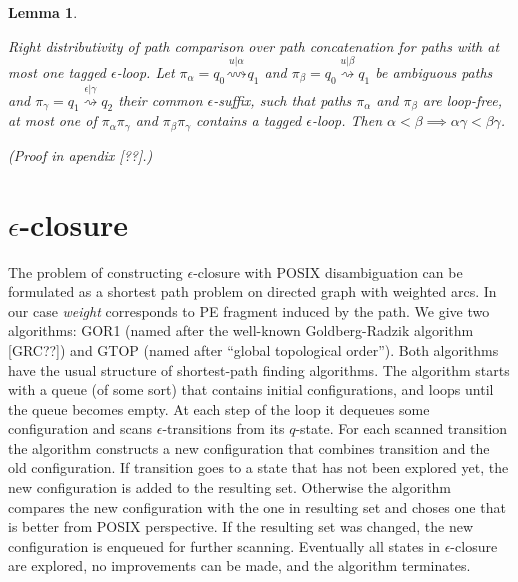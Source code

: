 \documentclass[AMA,STIX1COL]{WileyNJD-v2}
\newtheorem{XLem}{Lemma}
\begin{document}
\newcommand \lemmaclosurerightdist {
    \emph{Right distributivity of path comparison over path concatenation for paths with at most one tagged $\epsilon$-loop.}
    Let
    $\pi_\alpha = q_0 \overset {u | \alpha} {\rightsquigarrow} q_1$ and
    $\pi_\beta  = q_0 \overset {u | \beta}  {\rightsquigarrow} q_1$
    be ambiguous paths
    and $\pi_\gamma = q_1 \overset {\epsilon | \gamma} {\rightsquigarrow} q_2$
    their common $\epsilon$-suffix,
    such that paths $\pi_\alpha$ and $\pi_\beta$ are loop-free,
    at most one of $\pi_\alpha \pi_\gamma$ and $\pi_\beta \pi_\gamma$ contains a tagged $\epsilon$-loop.
    Then $\alpha < \beta \implies \alpha \gamma < \beta \gamma$.
}
\begin{XLem}\label{lemma_closure_rightdist}
\lemmaclosurerightdist
(Proof in apendix [??].)
\end{XLem}


\section{$\epsilon$-closure}\label{section_closure}

The problem of constructing $\epsilon$-closure with POSIX disambiguation
can be formulated as a shortest path problem on directed graph with weighted arcs.
In our case \emph{weight} corresponds to PE fragment induced by the path.
%
We give two algorithms: GOR1 (named after the well-known Goldberg-Radzik algorithm [GRC??])
and GTOP (named after ``global topological order'').
Both algorithms have the usual structure of shortest-path finding algorithms.
%
The algorithm starts with a queue (of some sort) that contains initial configurations, and loops until the queue becomes empty.
At each step of the loop it dequeues some configuration and scans $\epsilon$-transitions from its $q$-state.
For each scanned transition the algorithm constructs a new configuration that combines transition and the old configuration.
If transition goes to a state that has not been explored yet,
the new configuration is added to the resulting set.
Otherwise the algorithm compares the new configuration with the one in resulting set
and choses one that is better from POSIX perspective.
If the resulting set was changed, the new configuration is enqueued for further scanning.
Eventually all states in $\epsilon$-closure are explored, no improvements can be made, and the algorithm terminates.
\\
\end{document}
